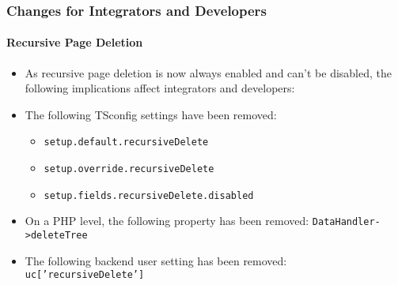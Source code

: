 %

\begin{frame}[fragile]
	\frametitle{Changes for Integrators and Developers}
	\framesubtitle{Recursive Page Deletion}

	\lstset{basicstyle=\tiny\ttfamily}

	\begin{itemize}
		\item As recursive page deletion is now always enabled and can't be disabled,
			the following implications affect integrators and developers:
		\item The following TSconfig settings have been removed:

			\begin{itemize}
				\item \texttt{setup.default.recursiveDelete}
				\item \texttt{setup.override.recursiveDelete}
				\item \texttt{setup.fields.recursiveDelete.disabled}
			\end{itemize}

		\item On a PHP level, the following property has been removed:\newline
			\small\texttt{DataHandler->deleteTree}\normalsize
		\item The following backend user setting has been removed:\newline
			\small\texttt{uc['recursiveDelete']}\normalsize

	\end{itemize}

\end{frame}

